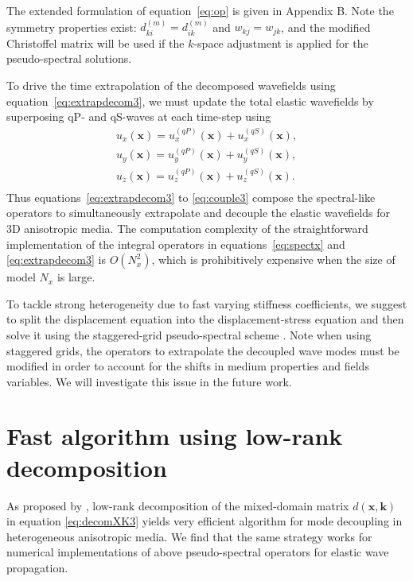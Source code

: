 The extended formulation of equation~\ref{eq:op} is given in Appendix B.
Note the symmetry properties exist: $d_{ki}^{(m)}=d_{ik}^{(m)}$ and $w_{kj}=w_{jk}$,
and the modified Christoffel matrix will be used if the $k$-space adjustment is applied for the 
pseudo-spectral solutions.

To drive the time extrapolation of the decomposed wavefields using
equation~\ref{eq:extrapdecom3}, we must update the total elastic
wavefields by superposing qP- and qS-waves at each time-step using
\begin{equation}
\begin{array}{lcl}
\label{eq:couple3}
	u_{x}(\mathbf{x}) =
	u_{x}^{(qP)}(\mathbf{x})+u_{x}^{(qS)}(\mathbf{x}),\\
	u_{y}(\mathbf{x}) =
	u_{y}^{(qP)}(\mathbf{x})+u_{y}^{(qS)}(\mathbf{x}),\\
	u_{z}(\mathbf{x}) =
	u_{z}^{(qP)}(\mathbf{x})+u_{z}^{(qS)}(\mathbf{x}).\\
\end{array}
\end{equation}
Thus equations~\ref{eq:extrapdecom3} to \ref{eq:couple3} compose the
spectral-like operators to simultaneously extrapolate and decouple
the elastic wavefields for 3D anisotropic media.
The computation complexity of the straightforward implementation of the integral
operators in equations~\ref{eq:spectx} and \ref{eq:extrapdecom3} is $O(N^2_x)$,
which is prohibitively expensive when the size of model $N_x$ is large.

To tackle strong heterogeneity due to fast varying stiffness coefficients, we suggest to split the displacement equation into the
displacement-stress equation and then solve it using the staggered-grid pseudo-spectral scheme
\cite[]{ozdenvar.mcmechan:1996,carcione:1999,bale:2003}.
Note when using staggered grids, the operators to extrapolate the decoupled wave modes must be modified in order to
account for the shifts in medium properties and fields variables. We will investigate this issue in the future work.

\section{Fast algorithm using low-rank decomposition}

As proposed by \cite{cheng.fomel:2014},
low-rank decomposition of the mixed-domain matrix
$d(\mathbf{x},\mathbf{k})$ in equation \ref{eq:decomXK3}
yields very efficient algorithm for mode decoupling
in heterogeneous anisotropic media. We find that the same strategy works for numerical
implementations of above pseudo-spectral operators for elastic wave propagation.

